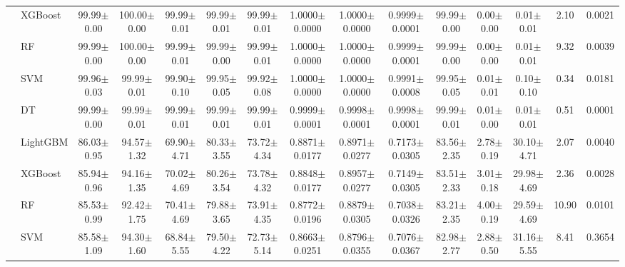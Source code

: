 \begin{tabular}{@{}llccccccccccccc@{}}
 & XGBoost & 99.99{\tiny$\pm$0.00} & 100.00{\tiny$\pm$0.00} & 99.99{\tiny$\pm$0.01} & 99.99{\tiny$\pm$0.01} & 99.99{\tiny$\pm$0.01} & 1.0000{\tiny$\pm$0.0000} & 1.0000{\tiny$\pm$0.0000} & 0.9999{\tiny$\pm$0.0001} & 99.99{\tiny$\pm$0.00} & 0.00{\tiny$\pm$0.00} & 0.01{\tiny$\pm$0.01} & 2.10 & 0.0021\\
 & RF & 99.99{\tiny$\pm$0.00} & 100.00{\tiny$\pm$0.00} & 99.99{\tiny$\pm$0.01} & 99.99{\tiny$\pm$0.00} & 99.99{\tiny$\pm$0.01} & 1.0000{\tiny$\pm$0.0000} & 1.0000{\tiny$\pm$0.0000} & 0.9999{\tiny$\pm$0.0001} & 99.99{\tiny$\pm$0.00} & 0.00{\tiny$\pm$0.00} & 0.01{\tiny$\pm$0.01} & 9.32 & 0.0039\\
 & SVM & 99.96{\tiny$\pm$0.03} & 99.99{\tiny$\pm$0.01} & 99.90{\tiny$\pm$0.10} & 99.95{\tiny$\pm$0.05} & 99.92{\tiny$\pm$0.08} & 1.0000{\tiny$\pm$0.0000} & 1.0000{\tiny$\pm$0.0000} & 0.9991{\tiny$\pm$0.0008} & 99.95{\tiny$\pm$0.05} & 0.01{\tiny$\pm$0.01} & 0.10{\tiny$\pm$0.10} & 0.34 & 0.0181\\
 & DT & 99.99{\tiny$\pm$0.00} & 99.99{\tiny$\pm$0.01} & 99.99{\tiny$\pm$0.01} & 99.99{\tiny$\pm$0.01} & 99.99{\tiny$\pm$0.01} & 0.9999{\tiny$\pm$0.0001} & 0.9998{\tiny$\pm$0.0001} & 0.9998{\tiny$\pm$0.0001} & 99.99{\tiny$\pm$0.01} & 0.01{\tiny$\pm$0.00} & 0.01{\tiny$\pm$0.01} & 0.51 & 0.0001\\
\midrule
{} & LightGBM & 86.03{\tiny$\pm$0.95} & 94.57{\tiny$\pm$1.32} & 69.90{\tiny$\pm$4.71} & 80.33{\tiny$\pm$3.55} & 73.72{\tiny$\pm$4.34} & 0.8871{\tiny$\pm$0.0177} & 0.8971{\tiny$\pm$0.0277} & 0.7173{\tiny$\pm$0.0305} & 83.56{\tiny$\pm$2.35} & 2.78{\tiny$\pm$0.19} & 30.10{\tiny$\pm$4.71} & 2.07 & 0.0040\\
 & XGBoost & 85.94{\tiny$\pm$0.96} & 94.16{\tiny$\pm$1.35} & 70.02{\tiny$\pm$4.69} & 80.26{\tiny$\pm$3.54} & 73.78{\tiny$\pm$4.32} & 0.8848{\tiny$\pm$0.0177} & 0.8957{\tiny$\pm$0.0277} & 0.7149{\tiny$\pm$0.0305} & 83.51{\tiny$\pm$2.33} & 3.01{\tiny$\pm$0.18} & 29.98{\tiny$\pm$4.69} & 2.36 & 0.0028\\
 & RF & 85.53{\tiny$\pm$0.99} & 92.42{\tiny$\pm$1.75} & 70.41{\tiny$\pm$4.69} & 79.88{\tiny$\pm$3.65} & 73.91{\tiny$\pm$4.35} & 0.8772{\tiny$\pm$0.0196} & 0.8879{\tiny$\pm$0.0305} & 0.7038{\tiny$\pm$0.0326} & 83.21{\tiny$\pm$2.35} & 4.00{\tiny$\pm$0.19} & 29.59{\tiny$\pm$4.69} & 10.90 & 0.0101\\
 & SVM & 85.58{\tiny$\pm$1.09} & 94.30{\tiny$\pm$1.60} & 68.84{\tiny$\pm$5.55} & 79.50{\tiny$\pm$4.22} & 72.73{\tiny$\pm$5.14} & 0.8663{\tiny$\pm$0.0251} & 0.8796{\tiny$\pm$0.0355} & 0.7076{\tiny$\pm$0.0367} & 82.98{\tiny$\pm$2.77} & 2.88{\tiny$\pm$0.50} & 31.16{\tiny$\pm$5.55} & 8.41 & 0.3654\\

\end{tabular}
